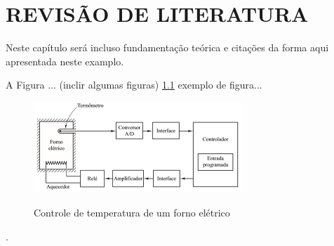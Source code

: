 
\chapter{REVISÃO DE LITERATURA}
\label{chap:fundamentacaoTeorica}

Neste capítulo será incluso fundamentação teórica e citações da forma aqui apresentada neste examplo.\cite{Ogata2010}

A Figura ... (inclir algumas figuras) \ref{fig:figura1} exemplo de figura...

\begin{figure}[!htb]
    \centering
    \caption{Controle de temperatura de um forno elétrico}
    \includegraphics[width=0.7\textwidth]{figuras/figu1.png}
    \label{fig:figura1}
\end{figure}












.
